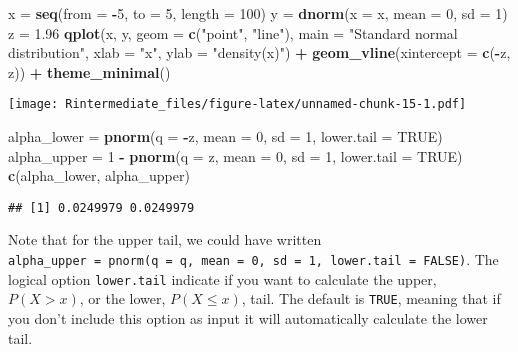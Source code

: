 \documentclass[]{article}
\newenvironment{Shaded}{\begin{snugshade}}{\end{snugshade}}
\newcommand{\KeywordTok}[1]{\textcolor[rgb]{0.13,0.29,0.53}{\textbf{#1}}}
\newcommand{\DataTypeTok}[1]{\textcolor[rgb]{0.13,0.29,0.53}{#1}}
\newcommand{\DecValTok}[1]{\textcolor[rgb]{0.00,0.00,0.81}{#1}}
\newcommand{\FloatTok}[1]{\textcolor[rgb]{0.00,0.00,0.81}{#1}}
\newcommand{\StringTok}[1]{\textcolor[rgb]{0.31,0.60,0.02}{#1}}
\newcommand{\OtherTok}[1]{\textcolor[rgb]{0.56,0.35,0.01}{#1}}
\newcommand{\OperatorTok}[1]{\textcolor[rgb]{0.81,0.36,0.00}{\textbf{#1}}}
\newcommand{\NormalTok}[1]{#1}
\begin{document}
\begin{Shaded}
\begin{Highlighting}[]
\NormalTok{x =}\StringTok{ }\KeywordTok{seq}\NormalTok{(}\DataTypeTok{from =} \OperatorTok{-}\DecValTok{5}\NormalTok{, }\DataTypeTok{to =} \DecValTok{5}\NormalTok{, }\DataTypeTok{length =} \DecValTok{100}\NormalTok{)}
\NormalTok{y =}\StringTok{ }\KeywordTok{dnorm}\NormalTok{(}\DataTypeTok{x =}\NormalTok{ x, }\DataTypeTok{mean =} \DecValTok{0}\NormalTok{, }\DataTypeTok{sd =} \DecValTok{1}\NormalTok{)}
\NormalTok{z =}\StringTok{ }\FloatTok{1.96}
\KeywordTok{qplot}\NormalTok{(x, y, }\DataTypeTok{geom =} \KeywordTok{c}\NormalTok{(}\StringTok{"point"}\NormalTok{, }\StringTok{"line"}\NormalTok{), }\DataTypeTok{main =} \StringTok{"Standard normal distribution"}\NormalTok{, }
    \DataTypeTok{xlab =} \StringTok{"x"}\NormalTok{, }\DataTypeTok{ylab =} \StringTok{"density(x)"}\NormalTok{) }\OperatorTok{+}\StringTok{ }\KeywordTok{geom_vline}\NormalTok{(}\DataTypeTok{xintercept =} \KeywordTok{c}\NormalTok{(}\OperatorTok{-}\NormalTok{z, }
\NormalTok{    z)) }\OperatorTok{+}\StringTok{ }\KeywordTok{theme_minimal}\NormalTok{()}
\end{Highlighting}
\end{Shaded}

\texttt{[image: Rintermediate\_files/figure-latex/unnamed-chunk-15-1.pdf]}

\begin{Shaded}
\begin{Highlighting}[]
\NormalTok{alpha_lower =}\StringTok{ }\KeywordTok{pnorm}\NormalTok{(}\DataTypeTok{q =} \OperatorTok{-}\NormalTok{z, }\DataTypeTok{mean =} \DecValTok{0}\NormalTok{, }\DataTypeTok{sd =} \DecValTok{1}\NormalTok{, }\DataTypeTok{lower.tail =} \OtherTok{TRUE}\NormalTok{)}
\NormalTok{alpha_upper =}\StringTok{ }\DecValTok{1} \OperatorTok{-}\StringTok{ }\KeywordTok{pnorm}\NormalTok{(}\DataTypeTok{q =}\NormalTok{ z, }\DataTypeTok{mean =} \DecValTok{0}\NormalTok{, }\DataTypeTok{sd =} \DecValTok{1}\NormalTok{, }\DataTypeTok{lower.tail =} \OtherTok{TRUE}\NormalTok{)}
\KeywordTok{c}\NormalTok{(alpha_lower, alpha_upper)}
\end{Highlighting}
\end{Shaded}

\begin{verbatim}
## [1] 0.0249979 0.0249979
\end{verbatim}

Note that for the upper tail, we could have written
\texttt{alpha\_upper\ =\ pnorm(q\ =\ q,\ mean\ =\ 0,\ sd\ =\ 1,\ lower.tail\ =\ FALSE)}.
The logical option \texttt{lower.tail} indicate if you want to calculate
the upper, \(P(X>x)\), or the lower, \(P(X\leq x)\), tail. The default
is \texttt{TRUE}, meaning that if you don't include this option as input
it will automatically calculate the lower tail.
\end{document}
